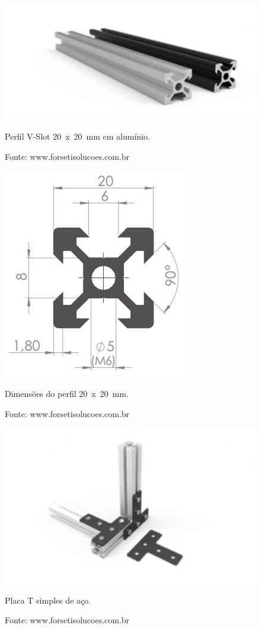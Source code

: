 \begin{figure}[H]
\centering
\includegraphics[scale = 0.4]{figuras/p20x20p}
\caption{Perfil V-Slot 20~x~20~mm em alumínio.}
\caption*{Fonte: www.forsetisolucoes.com.br}
\label{fig:p20x20p}
\end{figure}
    
\begin{figure}[H]
\centering
\includegraphics[scale = 1]{figuras/p20x20d}
\caption{Dimensões do perfil 20~x~20~mm.}
\caption*{Fonte: www.forsetisolucoes.com.br}
\label{fig:p20x20d}
\end{figure}
    
\begin{figure}[H]
\centering
\includegraphics[scale = 0.4]{figuras/placatp}
\caption{Placa T simples de aço.}
\caption*{Fonte: www.forsetisolucoes.com.br}
\label{fig:placatp}
\end{figure}
    
